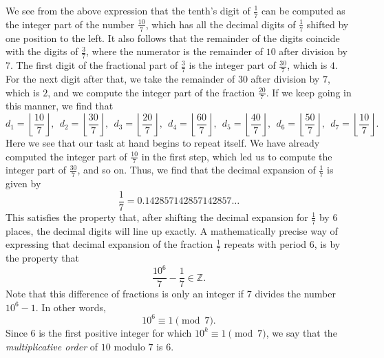 We see from the above expression that the tenth's digit of $\frac{1}{7}$ can be computed as the integer part of the number $\frac{10}{7}$, which has all the decimal digits of $\frac{1}{7}$ shifted by one position to the left. It also follows that the remainder of the digits coincide with the digits of $\frac{3}{7}$, where the numerator is the remainder of $10$ after division by $7$. The first digit of the fractional part of $\frac{3}{7}$ is the integer part of $\frac{30}{7}$, which is $4$. For the next digit after that, we take the remainder of $30$ after division by $7$, which is $2$, and we compute the integer part of the fraction $\frac{20}{7}$. If we keep going in this manner, we find that
\begin{equation*}
  d_1=\left\lfloor\frac{10}{7}\right\rfloor,~~
  d_2=\left\lfloor\frac{30}{7}\right\rfloor,~~
  d_3=\left\lfloor\frac{20}{7}\right\rfloor,~~
  d_4=\left\lfloor\frac{60}{7}\right\rfloor,~~
  d_5=\left\lfloor\frac{40}{7}\right\rfloor,~~
  d_6=\left\lfloor\frac{50}{7}\right\rfloor,~~
  d_7=\left\lfloor\frac{10}{7}\right\rfloor.
\end{equation*}
Here we see that our task at hand begins to repeat itself. We have already computed the integer part of $\frac{10}{7}$ in the first step, which led us to compute the integer part of $\frac{30}{7}$, and so on. Thus, we find that the decimal expansion of $\frac{1}{7}$ is given by
\begin{equation*}
  \frac{1}{7}=0.142857142857142857\ldots
\end{equation*}
This satisfies the property that, after shifting the decimal expansion for $\frac{1}{7}$ by $6$ places, the decimal digits will line up exactly. A mathematically precise way of expressing that decimal expansion of the fraction $\frac{1}{7}$ repeats with period $6$, is by the property that
\begin{equation*}
  \frac{10^6}{7}-\frac{1}{7}\in\mathbb{Z}.
\end{equation*}
Note that this difference of fractions is only an integer if $7$ divides the number $10^6-1$. In other words,
\begin{equation*}
  10^6\equiv 1\pmod{7}.
\end{equation*}
Since $6$ is the first positive integer for which $10^k\equiv 1\pmod{7}$, we say that the \emph{multiplicative order} of $10$ modulo $7$ is $6$.


